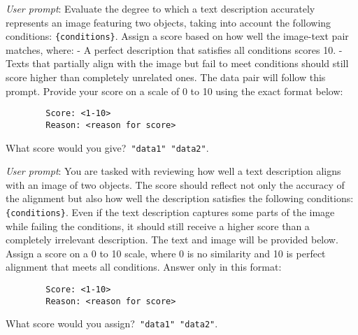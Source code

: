 \begin{tcolorbox}[enhanced,attach boxed title to top center={yshift=-3mm,yshifttext=-1mm},
  colback=green!5!white,colframe=green!20!gray,colbacktitle=green!20!gray,
  title=Image-Text Prompt Template V3,fonttitle=\bfseries,
  boxed title style={size=small,colframe=green!20!gray} ]

        \emph{User prompt}: Evaluate the degree to which a text description accurately represents an image featuring two objects, taking into account the following conditions: \texttt{\{conditions\}}. Assign a score based on how well the image-text pair matches, where:
        - A perfect description that satisfies all conditions scores 10.
        - Texts that partially align with the image but fail to meet conditions should still score higher than completely unrelated ones.
        The data pair will follow this prompt. Provide your score on a scale of 0 to 10 using the exact format below:
        
        \begin{verbatim}
        Score: <1-10>
        Reason: <reason for score>
        \end{verbatim}
        
        What score would you give?\
        \texttt{"data1"}\
        \texttt{"data2"}.\
        
\end{tcolorbox}

\begin{tcolorbox}[enhanced,attach boxed title to top center={yshift=-3mm,yshifttext=-1mm},
  colback=green!5!white,colframe=green!20!gray,colbacktitle=green!20!gray,
  title=Image-Text Prompt Template V4,fonttitle=\bfseries,
  boxed title style={size=small,colframe=green!20!gray} ]

        \emph{User prompt}: You are tasked with reviewing how well a text description aligns with an image of two objects. The score should reflect not only the accuracy of the alignment but also how well the description satisfies the following conditions: \texttt{\{conditions\}}. Even if the text description captures some parts of the image while failing the conditions, it should still receive a higher score than a completely irrelevant description. The text and image will be provided below. Assign a score on a 0 to 10 scale, where 0 is no similarity and 10 is perfect alignment that meets all conditions. Answer only in this format:
        
        \begin{verbatim}
        Score: <1-10>
        Reason: <reason for score>
        \end{verbatim}
        
        What score would you assign?\
        \texttt{"data1"}\
        \texttt{"data2"}.\
        
\end{tcolorbox}

